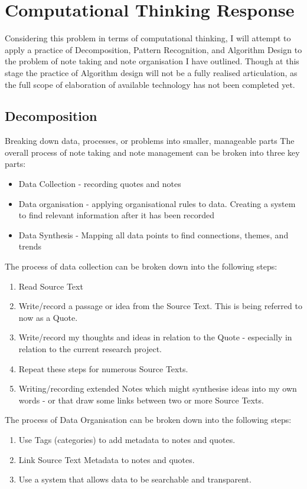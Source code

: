 \documentclass{article}
\begin{document}
\section{Computational Thinking Response}

Considering this problem in terms of computational thinking, I will attempt to apply a practice of Decomposition, Pattern Recognition, and Algorithm Design to the problem of note taking and note organisation I have outlined. Though at this stage the practice of Algorithm design will not be a fully realised articulation, as the full scope of elaboration of available technology has not been completed yet.

\subsection{Decomposition}
Breaking down data, processes, or problems into smaller, manageable parts
The overall process of note taking and note management can be broken into three key parts:
\begin{itemize}
    \item Data Collection - recording quotes and notes
    \item Data organisation - applying organisational rules to data. Creating a system to find relevant information after it has been recorded
    \item Data Synthesis - Mapping all data points to find connections, themes, and trends
\end{itemize}

The process of data collection can be broken down into the following steps:
\begin{enumerate}
    \item Read Source Text
    \item Write/record a passage or idea from the Source Text. This is being referred to now as a Quote.
    \item Write/record my thoughts and ideas in relation to the Quote - especially in relation to the current research project.
    \item Repeat these steps for numerous Source Texts.
    \item Writing/recording extended Notes which might synthesise ideas into my own words - or that draw some links between two or more Source Texts.
\end{enumerate}

The process of Data Organisation can be broken down into the following steps:
\begin{enumerate}
    \item Use Tags (categories) to add metadata to notes and quotes.
    \item Link Source Text Metadata to notes and quotes.
    \item Use a system that allows data to be searchable and transparent.
\end{enumerate}
\end{document}
